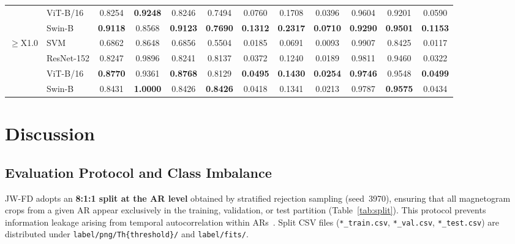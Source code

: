 \documentclass[universe,article,submit,moreauthors]{Definitions/mdpi}
\newif\ifrevision
\newcommand{\add}[1]{\ifrevision\textcolor{blue}{#1}\else#1\fi}
\newcommand{\del}[1]{\ifrevision\textcolor{red}{\sout{#1}}\else\fi}
\begin{document}
\begin{table}[H]
\begin{tabular*}{\textwidth}{@{\extracolsep{\fill}}llcccccccccc@{}}
 & ViT-B/16 & 0.8254 & \textbf{0.9248} & 0.8246 & 0.7494 & 0.0760 & 0.1708 & 0.0396 & 0.9604 & 0.9201 & 0.0590 \\
 & Swin-B & \textbf{0.9118} & 0.8568 & \textbf{0.9123} & \textbf{0.7690} & \textbf{0.1312} & \textbf{0.2317} & \textbf{0.0710} & \textbf{0.9290} & \textbf{0.9501} & \textbf{0.1153} \\
\midrule
\multirow{4}{*}{$\geq$X1.0} & SVM & 0.6862 & 0.8648 & 0.6856 & 0.5504 & 0.0185 & 0.0691 & 0.0093 & 0.9907 & 0.8425 & 0.0117 \\
 & ResNet-152 & 0.8247 & 0.9896 & 0.8241 & 0.8137 & 0.0372 & 0.1240 & 0.0189 & 0.9811 & 0.9460 & 0.0322 \\
 & ViT-B/16 & \textbf{0.8770} & 0.9361 & \textbf{0.8768} & 0.8129 & \textbf{0.0495} & \textbf{0.1430} & \textbf{0.0254} & \textbf{0.9746} & 0.9548 & \textbf{0.0499} \\
 & Swin-B & 0.8431 & \textbf{1.0000} & 0.8426 & \textbf{0.8426} & 0.0418 & 0.1341 & 0.0213 & 0.9787 & \textbf{0.9575} & 0.0434 \\
\bottomrule
\end{tabular*}
\end{table}

\section{Discussion}
\label{sec:discussion}

\subsection{Evaluation Protocol and Class Imbalance}
\label{sec:validation}

JW-FD adopts an \textbf{8:1:1 split at the AR level} obtained by stratified rejection sampling (seed~3970), ensuring that all magnetogram crops from a given AR appear exclusively in the training, validation, or test partition (Table~\ref{tab:split}). This protocol prevents information leakage arising from temporal autocorrelation within ARs~\cite{Barnes2016,Leka2019}. \del{A random allocation by AR count does not, however, balance rare M5 and X positives: under seed~62 the X1.0 validation set contained 833 positive 24~h frames against 370 in test, largely because NOAA~4274 (five X-class flares) occupied validation. The released assignment therefore keeps the seed-62 membership for C-only and quiet regions and moves 19 flare-productive regions, matching validation and test in X-class (6/6) and M5-class (11/11) positive ARs. The positive-frame table reports the resulting counts in training, validation, and test at all seven horizons.} Split CSV files (\texttt{*\_train.csv}, \texttt{*\_val.csv}, \texttt{*\_test.csv}) are distributed under \texttt{label/png/Th\{threshold\}/} and \texttt{label/fits/}.
\end{document}
